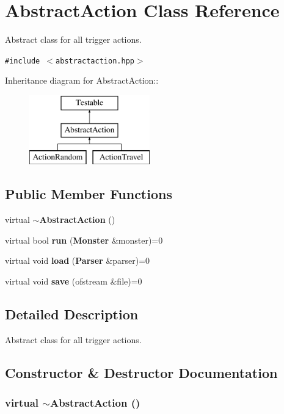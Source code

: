 \section{Abstract\-Action Class Reference}
\label{classAbstractAction}
Abstract class for all trigger actions.  


{\tt \#include $<$abstractaction.hpp$>$}

Inheritance diagram for Abstract\-Action::\begin{figure}[H]
\begin{center}
\leavevmode
\includegraphics[height=3cm]{classAbstractAction}
\end{center}
\end{figure}
\subsection*{Public Member Functions}
\begin{CompactItemize}
\item 
virtual {\bf $\sim$Abstract\-Action} ()
\item 
virtual bool {\bf run} ({\bf Monster} \&monster)=0
\item 
virtual void {\bf load} ({\bf Parser} \&parser)=0
\item 
virtual void {\bf save} (ofstream \&file)=0
\end{CompactItemize}


\subsection{Detailed Description}
Abstract class for all trigger actions. 



\subsection{Constructor \& Destructor Documentation}
\subsubsection{\setlength{\rightskip}{0pt plus 5cm}virtual $\sim${\bf Abstract\-Action} ()\hspace{0.3cm}{\tt  [inline, virtual]}}\label{classAbstractAction_a0}




